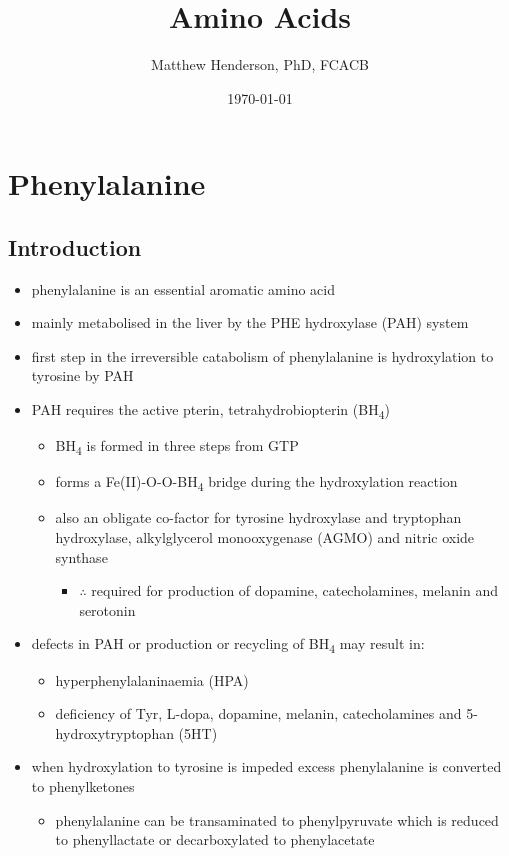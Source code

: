 \documentclass{scrartcl}
\author{Matthew Henderson, PhD, FCACB}
\date{\today}
\title{Amino Acids}
\begin{document}
\maketitle
\setcounter{tocdepth}{2}
\tableofcontents


\section{Phenylalanine}
\label{sec:orgc1b544a}
\subsection{Introduction}
\label{sec:org0079a6e}
\begin{itemize}
\item phenylalanine is an essential aromatic amino acid
\end{itemize}


\chemnameinit{}

\begin{itemize}
\item mainly metabolised in the liver by the PHE hydroxylase (PAH) system
\item first step in the irreversible catabolism of phenylalanine is hydroxylation to
tyrosine by PAH
\item PAH requires the active pterin, tetrahydrobiopterin (BH\textsubscript{4})
\begin{itemize}
\item BH\textsubscript{4} is formed in three steps from GTP
\item forms a Fe(II)-O-O-BH\textsubscript{4} bridge during the hydroxylation reaction
\item also an obligate co-factor for tyrosine hydroxylase and tryptophan
hydroxylase, alkylglycerol monooxygenase (AGMO) and nitric oxide
synthase
\begin{itemize}
\item \(\therefore\) required for production of dopamine, catecholamines,
melanin and serotonin
\end{itemize}
\end{itemize}

\item defects in PAH or production or recycling of BH\textsubscript{4} may result in:
\begin{itemize}
\item hyperphenylalaninaemia (HPA)
\item deficiency of Tyr, L-dopa, dopamine, melanin, catecholamines and 5-hydroxytryptophan (5HT)
\end{itemize}
\item when hydroxylation to tyrosine is impeded excess phenylalanine is converted to phenylketones
\begin{itemize}
\item phenylalanine can be transaminated to phenylpyruvate which is reduced to
phenyllactate or decarboxylated to phenylacetate
\end{itemize}
\end{itemize}
\end{document}
